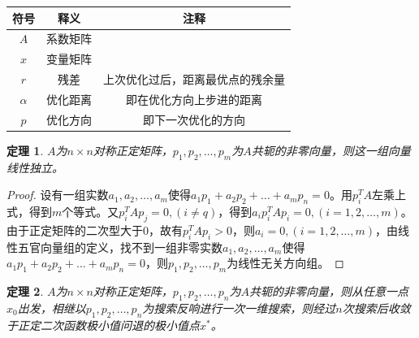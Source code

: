 \documentclass{ML}
\newtheorem{theorem}{定理}
\begin{document}
\begin{table}[H]
	\centering
	\begin{tabular}{ccc}
		\hline
		符号       & 释义     & 注释                             \\ \hline
		\(A\)      & 系数矩阵 &                                  \\
		\(x\)      & 变量矩阵 &                                  \\
		\(r\)      & 残差     & 上次优化过后，距离最优点的残余量 \\
		\(\alpha\) & 优化距离 & 即在优化方向上步进的距离         \\
		\(p\)      & 优化方向 & 即下一次优化的方向               \\ \hline
	\end{tabular}
\end{table}

\begin{theorem}
	\(A\)为\(n×n\)对称正定矩阵，\(p_1,p_2,…,p_m\)为\(A\)共轭的非零向量，则这一组向量线性独立。
\end{theorem}

\begin{proof}
	设有一组实数\(a_1,a_2,…,a_m\)使得\(a_1p_1+a_2p_2+…+a_mp_n = 0\)。用\(p_i^TA\)左乘上式，得到\(m\)个等式。又\(p_i^T A p_j = 0,(i≠q)\)，得到\(a_ip_i^TAp_i = 0,(i = 1,2,…,m)\)。由于正定矩阵的二次型大于0，故有\(p_i^TAp_i > 0\)，则\(a_i=0,(i = 1,2,…,m)\)，由线性五官向量组的定义，找不到一组非零实数\(a_1,a_2,…,a_m\)使得\(a_1p_1+a_2p_2+…+a_mp_n = 0\)，则\(p_1,p_2,…,p_m\)为线性无关方向组。
\end{proof}

\begin{theorem}
	\(A\)为\(n×n\)对称正定矩阵，\(p_1,p_2,…,p_n\)为\(A\)共轭的非零向量，则从任意一点\(x_0\)出发，相继以\(p_1,p_2,…,p_n\)为搜索反响进行一次一维搜索，则经过\(n\)次搜索后收敛于正定二次函数极小值问退的极小值点\(x^*\)。
\end{theorem}
\end{document}

